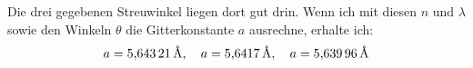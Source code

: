 Die drei gegebenen Streuwinkel liegen dort gut drin. Wenn ich mit diesen $n$ und $\lambda$ sowie den Winkeln $\theta$ die Gitterkonstante $a$ ausrechne, erhalte ich:
\[
	a = \SI{5.64321}\angstrom
	,\quad
	a = \SI{5.6417}\angstrom
	,\quad
	a = \SI{5.63996}\angstrom
\]


\IfFileExists{\bibliographyfile}{
	
}{}



